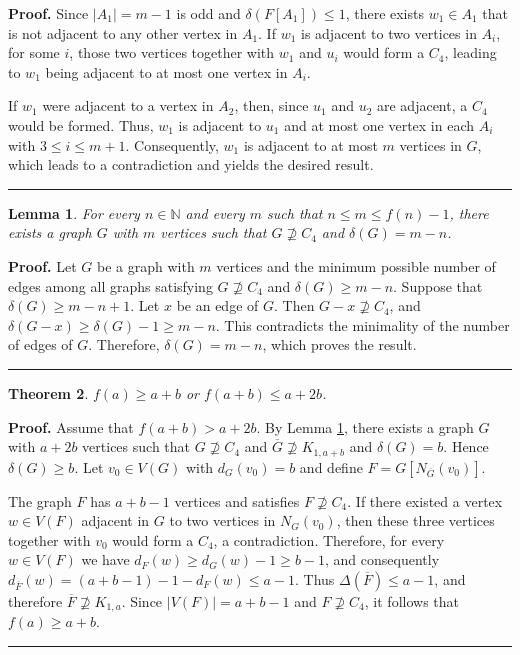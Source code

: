 \documentclass[12]{article}
\newtheorem{theorem}{Theorem}
\newtheorem{lemma}[theorem]{Lemma}
\newenvironment{proof}[1][Proof]{\textbf{#1.} }{\ \rule{0.5em}{0.5em}}
\begin{document}
\begin{proof}
Since $|A_1|=m-1$ is odd and $\delta(F[A_1])\le 1$, there exists $w_1\in A_1$ that is not adjacent to any other vertex in $A_1$. If $w_1$ is adjacent to two vertices in $A_i$, for some $i$, those two vertices  together with $w_1$ and $u_i$ would form a $C_4$, leading to $w_1$ being adjacent to at most one vertex in $A_i$.

If $w_1$ were adjacent to a vertex in $A_2$, then, since $u_1$ and $u_2$ are adjacent, a $C_4$ would be formed. Thus, $w_1$ is adjacent to $u_1$ and at most one vertex in each $A_i$ with $3\le i\le m+1$. Consequently, $w_1$ is adjacent to at most $m$ vertices in $G$, which leads to a contradiction and yields the desired result.
\end{proof}

\begin{lemma} \label{l5}
For every $n\in \mathbb{N}$ and every $m$ such that $n\le m\le f(n)-1$, there exists a graph $G$ with $m$ vertices such that $G\nsupseteq C_4$ and $\delta(G)=m-n$.
\end{lemma}
\begin{proof}
Let $G$ be a graph with $m$ vertices and the minimum possible number of edges among all graphs satisfying $G\nsupseteq C_4$ and $\delta(G)\ge m-n$. Suppose that $\delta(G)\ge m-n+1$. Let $x$ be an edge of $G$. Then $G-x\nsupseteq C_4$, and
$\delta(G-x)\ge \delta(G)-1\ge m-n$. This contradicts the minimality of the number of edges of $G$. Therefore, $\delta(G)=m-n$, which proves the result.
\end{proof}

\begin{theorem} 
$f(a) \ge a+b$ or $f(a+b) \le a+2b$.
\end{theorem}

\begin{proof}
Assume that $f(a+b) > a+2b$. By Lemma \ref{l5}, there exists a graph $G$ with $a+2b$ vertices such that $G \nsupseteq C_4$ and $\overline{G} \nsupseteq K_{1, a+b}$ and $\delta(G)=b$. Hence $\delta(G) \ge b$. Let $v_0 \in V(G)$ with $d_G(v_0)=b$ and define $F = G\left[N_{\overline{G}}(v_0)\right]$.

The graph $F$ has $a+b-1$ vertices and satisfies $F \nsupseteq C_4$. If there existed a vertex $w \in V(F)$ adjacent in $G$ to two vertices in $N_G(v_0)$, then these three vertices together with $v_0$ would form a $C_4$, a contradiction. Therefore, for every $w \in V(F)$ we have $d_F(w) \ge d_G(w) - 1 \ge b-1$, and consequently $d_{\overline{F}}(w)=(a+b-1) - 1 - d_F(w) \le a-1$. 
Thus $\Delta(\overline F)\le a-1$, and therefore
$\overline F\nsupseteq K_{1,a}$.
Since $|V(F)|=a+b-1$ and $F\nsupseteq C_4$, it follows that
$f(a)\ge a+b$.
\end{proof}
\end{document}
